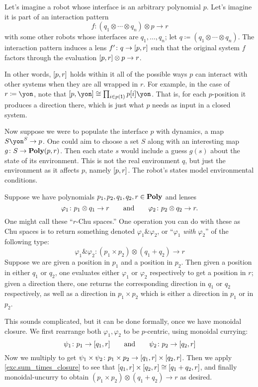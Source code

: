 \documentclass[Book-Poly]{subfiles}
\begin{document}
\begin{example}
Let's imagine a robot whose interface is an arbitrary polynomial $p$. Let's imagine it is part of an interaction pattern
\[
	f\colon (q_1\otimes\cdots\otimes q_n)\otimes p\to r
\]
with some other robots whose interfaces are $q_1,\ldots,q_n$; let $q\coloneqq(q_1\otimes\cdots\otimes q_n)$. The interaction pattern induces a lens $f'\colon q\to [p,r]$ such that the original system $f$ factors through the evaluation $[p,r]\otimes p\to r$.

In other words, $[p,r]$ holds within it all of the possible ways $p$ can interact with other systems when they are all wrapped in $r$.
For example, in the case of $r\coloneqq\yon$, note that $\ihom{p,\yon}\cong\prod_{i\in p(\1)}p[i]\yon$.
That is, for each $p$-position it produces a direction there, which is just what $p$ needs as input in a closed system.

Now suppose we were to populate the interface $p$ with dynamics, a map $S\yon^S\to p$. One could aim to choose a set $S$ along with an interesting map $g\colon S\to\mathbf{Poly}(p,r)$. Then each state $s$ would include a guess $g(s)$ about the state of its environment. This is not the real environment $q$, but just the environment as it affects $p$, namely $[p,r]$. The robot's states model environmental conditions.
\end{example}

\begin{example}[Chu $\&$]
Suppose we have polynomials $p_1,p_2,q_1,q_2,r\in\mathbf{Poly}$ and lenses
\[
	\varphi_1\colon p_1\otimes q_1\to r
	\qquad\text{and}\qquad
	\varphi_2\colon p_2\otimes q_2\to r.
\]
One might call these ``$r$-Chu spaces.'' One operation you can do with these as Chu spaces is to return something denoted $\varphi_1\&\varphi_2$, or ``$\varphi_1$ \emph{with} $\varphi_2$'' of the following type:
\[
\varphi_1\&\varphi_2\colon (p_1\times p_2)\otimes (q_1+q_2)\to r
\]
Suppose we are given a position in $p_1$ and a position in $p_2$. Then given a position in either $q_1$ or $q_2$, one evaluates either $\varphi_1$ or $\varphi_2$ respectively to get a position in $r$; given a direction there, one returns the corresponding direction in $q_1$ or $q_2$ respectively, as well as a direction in $p_1\times p_2$ which is either a direction in $p_1$ or in $p_2$.

This sounds complicated, but it can be done formally, once we have monoidal closure. We first rearrange both $\varphi_1,\varphi_2$ to be $p$-centric, using monoidal currying:
\[
\psi_1\colon p_1\to [q_1,r]
\qquad\text{and}\qquad
\psi_2\colon p_2\to [q_2,r]
\]
Now we multiply to get $\psi_1\times\psi_2\colon p_1\times p_2\to[q_1,r]\times[q_2,r]$. Then we apply \cref{exc.sum_times_closure} to see that $[q_1,r]\times[q_2,r]\cong[q_1+q_2,r]$, and finally monoidal-uncurry to obtain $(p_1\times p_2)\otimes(q_1+q_2)\to r$ as desired.
\end{example}
\end{document}
